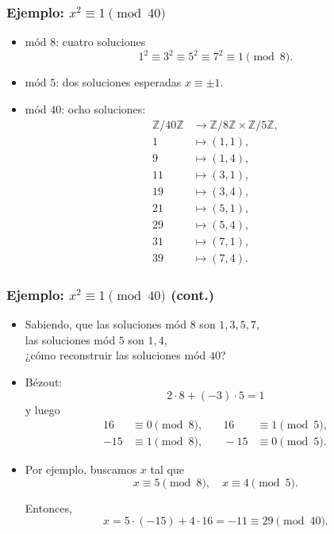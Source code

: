 \documentclass[handout]{beamer}
\newcommand{\ZZ}{\mathbb{Z}}
\begin{document}
\begin{frame}
  \frametitle{Ejemplo: $x^2 \equiv 1 \pmod{40}$}

  \begin{itemize}
  \item<2-> mód $8$: cuatro soluciones 
    $$1^2 \equiv 3^2 \equiv 5^2 \equiv 7^2 \equiv 1 \pmod{8}.$$

  \item<3-> mód $5$: dos soluciones esperadas $x \equiv \pm 1$.

  \item<4-> mód $40$: ocho soluciones:
    \begin{align*}
      \ZZ/40\ZZ & \to \ZZ/8\ZZ \times \ZZ/5\ZZ, \\
      1 & \mapsto (1, 1), \\
      9 & \mapsto (1, 4), \\
      11 & \mapsto (3, 1), \\
      19 & \mapsto (3, 4), \\
      21 & \mapsto (5, 1), \\
      29 & \mapsto (5, 4), \\
      31 & \mapsto (7, 1), \\
      39 & \mapsto (7, 4).
    \end{align*}
  \end{itemize}
\end{frame}


\begin{frame}
  \frametitle{Ejemplo: $x^2 \equiv 1 \pmod{40}$ (cont.)}

  \begin{itemize}
  \item<2-> Sabiendo, que las soluciones mód $8$ son $1,3,5,7$,\\
    las soluciones mód $5$ son $1,4$,\\
    ¿cómo reconstruir las soluciones mód $40$?

  \item<3-> Bézout:
    $$2\cdot 8 + (-3)\cdot 5 = 1$$
    y luego
    \begin{align*}
      16 & \equiv 0 \pmod{8}, & \quad 16 & \equiv 1 \pmod{5}, \\
      -15 & \equiv 1 \pmod{8}, & \quad -15 & \equiv 0 \pmod{5}.
    \end{align*}

  \item<4-> Por ejemplo, buscamos $x$ tal que
    \[ x \equiv 5 \pmod{8}, \quad x \equiv 4 \pmod{5}. \]

    Entonces,
    \[ x = 5\cdot (-15) + 4\cdot 16 = -11 \equiv 29 \pmod{40}. \]
  \end{itemize}
\end{frame}
\end{document}
